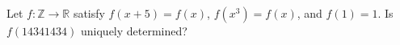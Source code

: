Let $f:\mathbb Z\to\mathbb R$ satisfy $f(x+5)=f(x)$, $f(x^3)=f(x)$, and $f(1)=1$. Is $f(14341434)$ uniquely determined?
